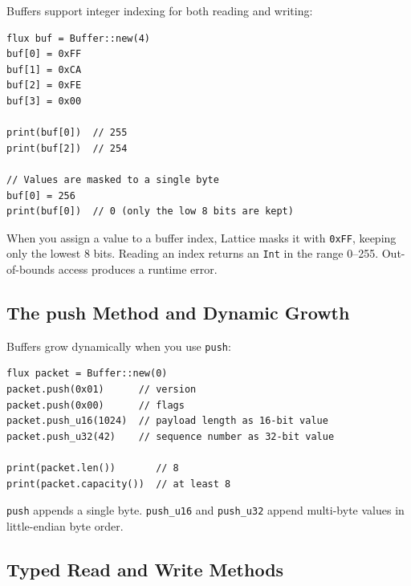 
Buffers support integer indexing for both reading and writing:

\begin{lstlisting}[language=Lattice, caption={Buffer indexing}]
flux buf = Buffer::new(4)
buf[0] = 0xFF
buf[1] = 0xCA
buf[2] = 0xFE
buf[3] = 0x00

print(buf[0])  // 255
print(buf[2])  // 254

// Values are masked to a single byte
buf[0] = 256
print(buf[0])  // 0 (only the low 8 bits are kept)
\end{lstlisting}

When you assign a value to a buffer index, Lattice masks it with
\texttt{0xFF}, keeping only the lowest 8 bits. Reading an index returns an
\lstinline|Int| in the range 0--255. Out-of-bounds access produces a runtime
error.

\subsection{The push Method and Dynamic Growth}\label{sec:buffer-push}


Buffers grow dynamically when you use \lstinline|push|:

\begin{lstlisting}[language=Lattice, caption={Building a buffer byte by byte}]
flux packet = Buffer::new(0)
packet.push(0x01)      // version
packet.push(0x00)      // flags
packet.push_u16(1024)  // payload length as 16-bit value
packet.push_u32(42)    // sequence number as 32-bit value

print(packet.len())       // 8
print(packet.capacity())  // at least 8
\end{lstlisting}

\lstinline|push| appends a single byte. \lstinline|push_u16| and
\lstinline|push_u32| append multi-byte values in little-endian byte order.

\subsection{Typed Read and Write Methods}\label{sec:typed-buffer-access}


